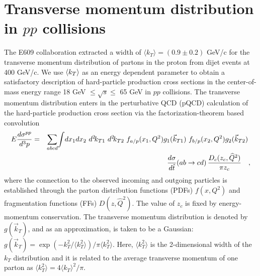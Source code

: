 \section{Transverse momentum distribution in $pp$ collisions}

The E609 collaboration extracted a width of 
$\langle k_T\rangle=(0.9 \pm 0.2)$ GeV/c
for the transverse momentum distribution of partons in the proton from
dijet events at 400 GeV/c\cite{corcoran91}. We 
use $\langle k_T\rangle$ as an energy dependent parameter
to obtain a satisfactory description of 
hard-particle production cross sections in the center-of-mass energy
range 18 GeV $\leq \sqrt{s} \leq$ 65 GeV in $pp$ collisions.
The transverse momentum
distribution enters in the perturbative QCD (pQCD) calculation of the 
hard-particle production cross section via the factorization-theorem 
based convolution
\begin{eqnarray}
\label{pQCD}
  E\frac{d\sigma^{pp}}{d^3p} &=&
        \sum_{abcd}\!  \int\!dx_1 dx_2\ d^2\!k_{T1}\ d^2\!k_{T2}\
        f_{a/p}(x_1,Q^2) g_1({\vec k}_{T1})\
        f_{b/p}(x_2,Q^2) g_2({\vec k}_{T2})\ \nonumber \\
          && \ \ \ \    \frac{d\sigma}{d\hat{t}}(ab\to c d)\,
   \frac{D_{c}(z_c,{\widehat Q}^2)}{\pi z_c} \ \ \  , 
\end{eqnarray}
where the connection to the observed incoming and outgoing 
particles is established through the
parton distribution functions (PDFs) $f(x,Q^2)$ and 
fragmentation functions (FFs) $D(z,{\widehat Q}^2)$\cite{Field89}.
The value of $z_c$ is fixed by energy-momentum conservation.
The transverse momentum distribution is denoted by
$g({\vec k}_{T})$, and as an approximation,
is taken to be a Gaussian:
$g({\vec k}_T) = \exp(-k_T^2/\langle k_T^2 \rangle)/
{\pi \langle k_T^2 \rangle}$.
Here, $\langle k_T^2 \rangle$ is the 2-dimensional width of the $k_T$
distribution and it is related to the average transverse momentum of one parton
as $\langle k_T^2 \rangle = 4 \langle k_T \rangle^2 /\pi$. 

